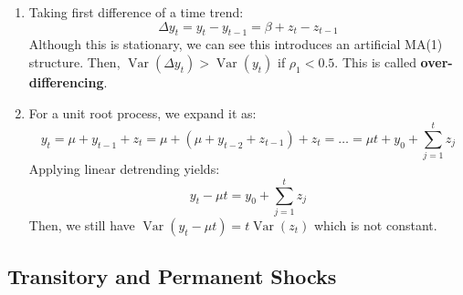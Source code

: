 \documentclass[notitlepage]{article}
\DeclareMathOperator{\Var}{Var}
\begin{document}
\begin{itemize}
    \begin{enumerate}
        \item Taking first difference of a time trend:
        \[
        \Delta y_t = y_t - y_{t-1} = \beta + z_t - z_{t-1}
        \]
        Although this is stationary, we can see this introduces an artificial MA(1) structure. Then, \(\Var(\Delta y_t) > \Var(y_t)\) if \(\rho_1 < 0.5\). This is called \textbf{over-differencing}.
        \item For a unit root process, we expand it as:
        \[
        y_t = \mu + y_{t-1} + z_t = \mu + (\mu + y_{t-2} + z_{t-1}) + z_t = \dots = \mu t + y_0 + \sum_{j=1}^t z_j
        \]
        Applying linear detrending yields:
        \[
        y_t - \mu t = y_0 + \sum_{j=1}^t z_j
        \]
        Then, we still have \(\Var(y_t - \mu t) = t \Var(z_t)\) which is not constant.
    \end{enumerate}
\end{itemize}

\subsection{Transitory and Permanent Shocks}
\end{document}
